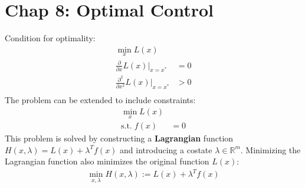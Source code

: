 \newpage
\section{Chap 8: Optimal Control}
Condition for optimality:
\begin{align*}
    \min_x L(x)                                                   \\
    \frac{\partial }{\partial x} L(x) \rvert_{x=x^\ast}     & = 0 \\
    \frac{\partial^2 }{\partial x^2} L(x) \rvert_{x=x^\ast} & > 0 \\
\end{align*}
The problem can be extended to include constraints:
\begin{align*}
    \min_x L(x)               \\
    \text{s.t.} \; f(x) & = 0
\end{align*}
This problem is solved by constructing a \textbf{Lagrangian} function $H(x,\lambda) = L(x) + \lambda^T f(x)$ and introducing a costate $\lambda \in \mathbb{R}^m$. Minimizing the Lagrangian function also minimizes the original function $L(x)$:
\begin{align*}
    \min_{x,\lambda} H(x,\lambda) := L(x) + \lambda^T f(x)
\end{align*}
